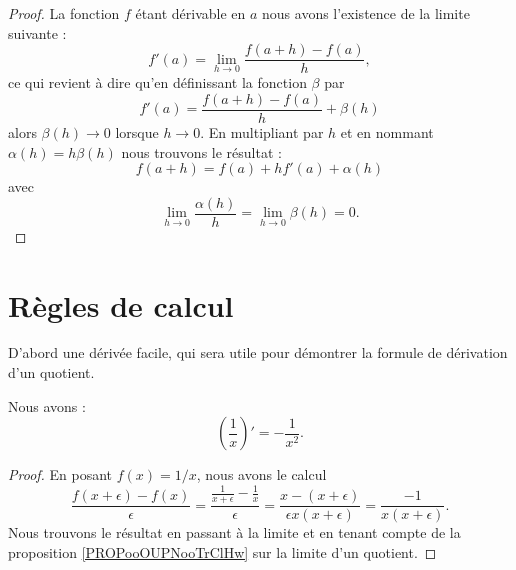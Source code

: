 \begin{proof}
    La fonction \( f\) étant dérivable en \( a\) nous avons l'existence de la limite suivante :
    \begin{equation}
        f'(a)=\lim_{h\to 0} \frac{ f(a+h)-f(a) }{ h },
    \end{equation}
    ce qui revient à dire qu'en définissant la fonction \( \beta\) par
    \begin{equation}
        f'(a)=\frac{ f(a+h)-f(a) }{ h }+\beta(h)
    \end{equation}
    alors \( \beta(h)\to 0\) lorsque \( h\to 0\). En multipliant par \( h\) et en nommant \( \alpha(h)=h\beta(h)\) nous trouvons le résultat :
    \begin{equation}
        f(a+h)=f(a)+hf'(a)+\alpha(h)
    \end{equation}
    avec
    \begin{equation}
        \lim_{h\to 0} \frac{ \alpha(h) }{ h }=\lim_{h\to 0} \beta(h)=0.
    \end{equation}
\end{proof}

\section{Règles de calcul}

D'abord une dérivée facile, qui sera utile pour démontrer la formule de dérivation d'un quotient.
\begin{lemma}
    Nous avons :
    \begin{equation}
        \left( \frac{1}{ x } \right)'=-\frac{1}{ x^2 }.
    \end{equation}
\end{lemma}

\begin{proof}
    En posant \( f(x)=1/x\), nous avons le calcul
    \begin{equation}
        \frac{ f(x+\epsilon)-f(x) }{ \epsilon }=\frac{ \frac{1}{ x+\epsilon }-\frac{1}{ x } }{ \epsilon }=\frac{ x-(x+\epsilon) }{ \epsilon x(x+\epsilon) }=\frac{ -1 }{ x(x+\epsilon) }.
    \end{equation}
    Nous trouvons le résultat en passant à la limite et en tenant compte de la proposition \ref{PROPooOUPNooTrClHw} sur la limite d'un quotient.
\end{proof}


